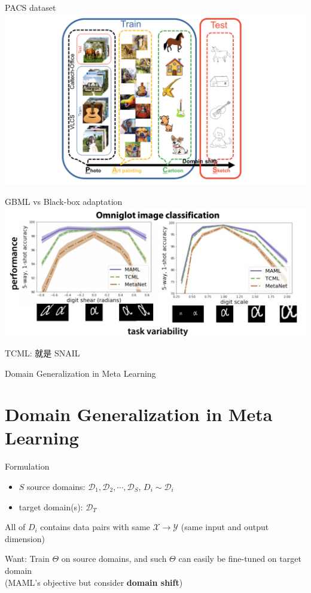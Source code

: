 \documentclass{beamer}
\begin{document}
\begin{frame}[t]{PACS dataset}
  \includegraphics[width=\textwidth]{fig/PACS-dataset.png}
\end{frame}

\begin{frame}[t]{GBML vs Black-box adaptation}
  \includegraphics[width=\textwidth]{fig/gbml-ood.png}

  TCML: 就是 SNAIL
\end{frame}

\begin{frame}
	\begin{center}
    \LARGE{Domain Generalization in Meta Learning}
	\end{center}
\end{frame}

\section{Domain Generalization in Meta Learning}

\begin{frame}{Formulation}
  \begin{itemize}
    \item $S$ source domains: $\mathcal{D}_1, \mathcal{D}_2, \cdots, \mathcal{D}_S$, $D_i \sim \mathcal{D}_i$
    \item target domain(s): $\mathcal{D}_T$
  \end{itemize}


  All of $D_i$ contains data pairs with same $\mathcal{X} \rightarrow \mathcal{Y}$ (same input and output dimension)

  \vspace{1em}

  Want: Train $\Theta$ on source domains, and such $\Theta$ can easily be fine-tuned on target domain\\
  (MAML's objective but consider \textbf{domain shift})
\end{frame}
\end{document}
